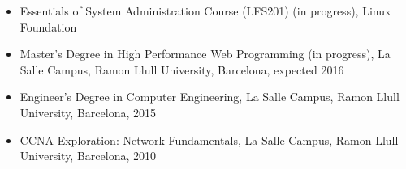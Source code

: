 \begin{itemize}[itemsep=0pt]

    \item Essentials of System Administration Course (LFS201) (in progress), Linux Foundation

    \item Master's Degree in High Performance Web Programming (in progress), La Salle Campus, Ramon Llull University, Barcelona, expected 2016

    \item Engineer's Degree in Computer Engineering, La Salle Campus, Ramon Llull University, Barcelona, 2015

    \item CCNA Exploration: Network Fundamentals, La Salle Campus, Ramon Llull University, Barcelona, 2010

\end{itemize}